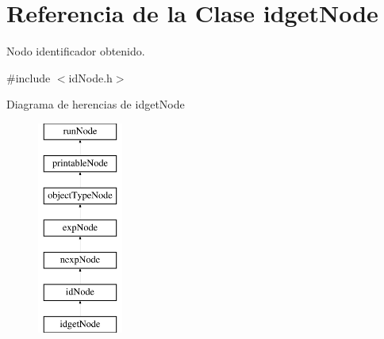 \hypertarget{classidgetNode}{\section{Referencia de la Clase idget\-Node}
\label{classidgetNode}
}


Nodo identificador obtenido.  




{\ttfamily \#include $<$id\-Node.\-h$>$}

Diagrama de herencias de idget\-Node\begin{figure}[H]
\begin{center}
\leavevmode
\includegraphics[height=7.000000cm]{classidgetNode}
\end{center}
\end{figure}
